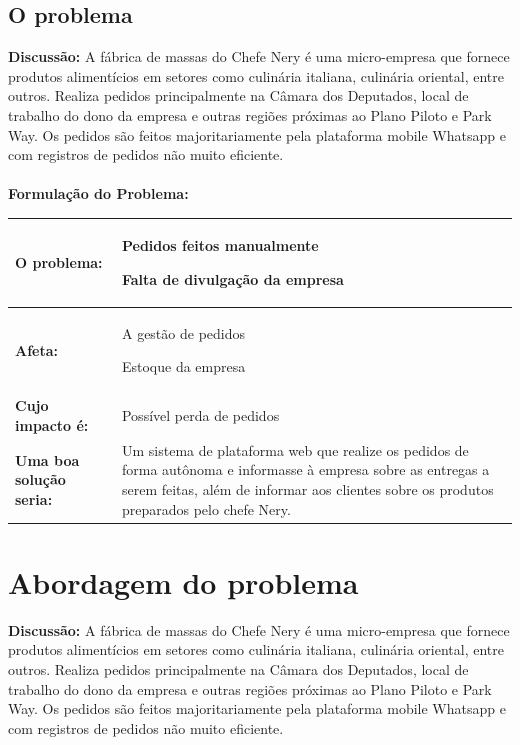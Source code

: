 \begin{apendicesenv}
{\subsection {O problema\\ }}
\textbf{Discussão:} A fábrica de massas do Chefe Nery é uma micro-empresa que fornece produtos alimentícios em setores como culinária italiana, culinária oriental, entre outros. Realiza pedidos principalmente na Câmara dos Deputados, local de trabalho do dono da empresa e outras regiões próximas ao Plano Piloto e Park Way. Os pedidos são feitos majoritariamente pela plataforma mobile Whatsapp e com registros de pedidos não muito eficiente. \\
\tab \\
\textbf{Formulação do Problema:}


\newcommand{\nextitem}{\par\hspace*{\labelsep}\textbullet\hspace*{\labelsep}}

\begin{tabular}{|l|p{3in}|}
  \hline
  \textbf{O problema:} & \nextitem Pedidos feitos manualmente
    \nextitem Falta de divulgação da empresa
    \\ \hline
  \textbf{Afeta:} & \nextitem A gestão de pedidos
    \nextitem Estoque da empresa
    \\ \hline
  \textbf{Cujo impacto é:} & \nextitem Possível perda de pedidos
    \\ \hline
  \textbf{Uma boa solução seria:} & \nextitem Um sistema de plataforma web que realize os pedidos de forma autônoma e informasse à empresa sobre as entregas a serem feitas, além de informar aos clientes sobre os produtos preparados pelo chefe Nery.
    \\ \hline

\end{tabular}

{\large {\section { Abordagem do problema \\ } } }

\textbf{Discussão:} A fábrica de massas do Chefe Nery é uma micro-empresa que fornece produtos alimentícios em setores como culinária italiana, culinária oriental, entre outros. Realiza pedidos principalmente na Câmara dos Deputados, local de trabalho do dono da empresa e outras regiões próximas ao Plano Piloto e Park Way. Os pedidos são feitos majoritariamente pela plataforma mobile Whatsapp e com registros de pedidos não muito eficiente. \\


\end{apendicesenv}
